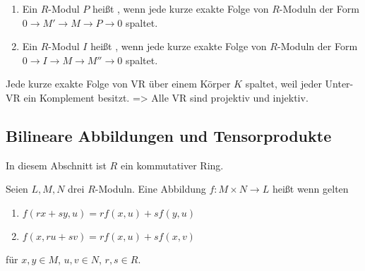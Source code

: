 \documentclass[../main.tex]{subfiles}
\begin{document}
\begin{definition}$ $
    \begin{enumerate}[label=\alph*)]
        \item 
        Ein $R$-Modul $P$ heißt , wenn jede kurze exakte Folge von $R$-Moduln der Form $0\rightarrow M' \rightarrow M \rightarrow P\rightarrow 0$ spaltet.
        \item 
        Ein $R$-Modul $I$ heißt , wenn jede kurze exakte Folge von $R$-Moduln der Form $0\rightarrow I\rightarrow M \rightarrow M'' \rightarrow 0$ spaltet.
    \end{enumerate}
\end{definition}

\begin{remark}
    Jede kurze exakte Folge von VR über einem Körper $K$ spaltet, weil jeder Unter-VR ein Komplement besitzt.
    => Alle VR sind projektiv und injektiv.
\end{remark}

\subsection{Bilineare Abbildungen und Tensorprodukte}
In diesem Abschnitt ist $R$ ein kommutativer Ring.
\begin{definition}
    Seien $L,M,N$ drei $R$-Moduln.
    Eine Abbildung $f:M\times N\rightarrow L$ heißt  wenn gelten
    \begin{enumerate}
        \item $f(rx+sy,u) = rf(x,u)+sf(y,u)$
        \item $f(x,ru+sv) = rf(x,u) + sf(x,v)$
    \end{enumerate}
    für $x,y\in M$, $u,v \in N$, $r,s\in R$.
\end{definition}
\end{document}

